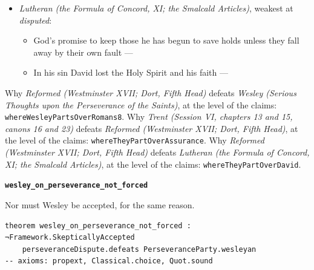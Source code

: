 \documentclass[11pt]{article}
\begin{document}
\begin{itemize}
\begin{itemize}
\item Justifying grace, once given, can be lost --- \cite[Trent, Session VI (1547), ch. 15]{tanner-decrees-1990}; \cite[42]{waterworth-trent-1848}; \cite[Trent, Session VI (1547), canon 23]{tanner-decrees-1990}; \cite[47]{waterworth-trent-1848}
\item an inference step --- \cite[329--330]{calvin-corinthians-1-1848}; \cite[Trent, Session VI (1547), ch. 13]{tanner-decrees-1990}; \cite[40--41]{waterworth-trent-1848}
\end{itemize}
\item \emph{Lutheran (the Formula of Concord, XI; the Smalcald Articles)}, weakest at \emph{disputed}:
\begin{itemize}
\item God’s promise to keep those he has begun to save holds unless they fall away by their own fault --- \cite[Solid Declaration XI.42]{concordia-triglotta-1921}
\item In his sin David lost the Holy Spirit and his faith --- \cite[Smalcald Articles III.iii.43]{concordia-triglotta-1921}
\end{itemize}
\end{itemize}
\noindent Why \emph{Reformed (Westminster XVII; Dort, Fifth Head)} defeats \emph{Wesley (Serious Thoughts upon the Perseverance of the Saints)}, at the level of the claims: \texttt{where\allowbreak{}Wesley\allowbreak{}Parts\allowbreak{}Over\allowbreak{}Romans8}.
\noindent Why \emph{Trent (Session VI, chapters 13 and 15, canons 16 and 23)} defeats \emph{Reformed (Westminster XVII; Dort, Fifth Head)}, at the level of the claims: \texttt{where\allowbreak{}They\allowbreak{}Part\allowbreak{}Over\allowbreak{}Assurance}.
\noindent Why \emph{Reformed (Westminster XVII; Dort, Fifth Head)} defeats \emph{Lutheran (the Formula of Concord, XI; the Smalcald Articles)}, at the level of the claims: \texttt{where\allowbreak{}They\allowbreak{}Part\allowbreak{}Over\allowbreak{}David}.
\par\medskip\noindent\textbf{\texttt{wesley\_\allowbreak{}on\_\allowbreak{}perseverance\_\allowbreak{}not\_\allowbreak{}forced}}\par\nobreak\noindent
Nor must Wesley be accepted, for the same reason.

{\small\begin{verbatim}
theorem wesley_on_perseverance_not_forced : ¬Framework.SkepticallyAccepted
    perseveranceDispute.defeats PerseveranceParty.wesleyan
-- axioms: propext, Classical.choice, Quot.sound
\end{verbatim}}
\end{document}
